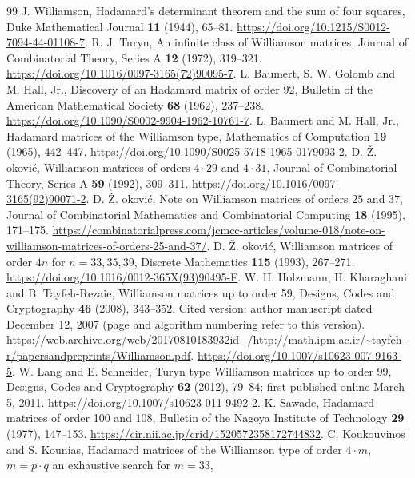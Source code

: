 \documentclass[11pt]{article}
\begin{document}
\begin{thebibliography}{99}
J. Williamson, Hadamard's determinant theorem and the sum of four squares,
Duke Mathematical Journal \textbf{11} (1944), 65--81.
\url{https://doi.org/10.1215/S0012-7094-44-01108-7}.
R. J. Turyn, An infinite class of Williamson matrices,
Journal of Combinatorial Theory, Series A \textbf{12} (1972), 319--321.
\url{https://doi.org/10.1016/0097-3165(72)90095-7}.
L. Baumert, S. W. Golomb and M. Hall, Jr., Discovery of an Hadamard
matrix of order 92, Bulletin of the American Mathematical Society
\textbf{68} (1962), 237--238.
\url{https://doi.org/10.1090/S0002-9904-1962-10761-7}.
L. Baumert and M. Hall, Jr., Hadamard matrices of the Williamson type,
Mathematics of Computation \textbf{19} (1965), 442--447.
\url{https://doi.org/10.1090/S0025-5718-1965-0179093-2}.
D. \v Z. \DJ okovi\'c, Williamson matrices of orders $4\cdot29$ and $4\cdot31$,
Journal of Combinatorial Theory, Series A \textbf{59} (1992), 309--311.
\url{https://doi.org/10.1016/0097-3165(92)90071-2}.
D. \v Z. \DJ okovi\'c, Note on Williamson matrices of orders $25$ and $37$,
Journal of Combinatorial Mathematics and Combinatorial Computing
\textbf{18} (1995), 171--175.
\url{https://combinatorialpress.com/jcmcc-articles/volume-018/note-on-williamson-matrices-of-orders-25-and-37/}.
D. \v Z. \DJ okovi\'c, Williamson matrices of order $4n$ for $n=33,35,39$,
Discrete Mathematics \textbf{115} (1993), 267--271.
\url{https://doi.org/10.1016/0012-365X(93)90495-F}.
W. H. Holzmann, H. Kharaghani and B. Tayfeh-Rezaie,
Williamson matrices up to order 59, Designs, Codes and Cryptography
\textbf{46} (2008), 343--352. Cited version: author manuscript dated
December 12, 2007 (page and algorithm numbering refer to this version).
\url{https://web.archive.org/web/20170810183932id_/http://math.ipm.ac.ir/~tayfeh-r/papersandpreprints/Williamson.pdf}.
\url{https://doi.org/10.1007/s10623-007-9163-5}.
W. Lang and E. Schneider, Turyn type Williamson matrices up to order 99,
Designs, Codes and Cryptography \textbf{62} (2012), 79--84;
first published online March 5, 2011.
\url{https://doi.org/10.1007/s10623-011-9492-2}.
K. Sawade, Hadamard matrices of order 100 and 108,
Bulletin of the Nagoya Institute of Technology \textbf{29} (1977), 147--153.
\url{https://cir.nii.ac.jp/crid/1520572358172744832}.
C. Koukouvinos and S. Kounias, Hadamard matrices of the Williamson type
of order $4\cdot m$, $m=p\cdot q$ an exhaustive search for $m=33$,

\end{thebibliography}
\end{document}
